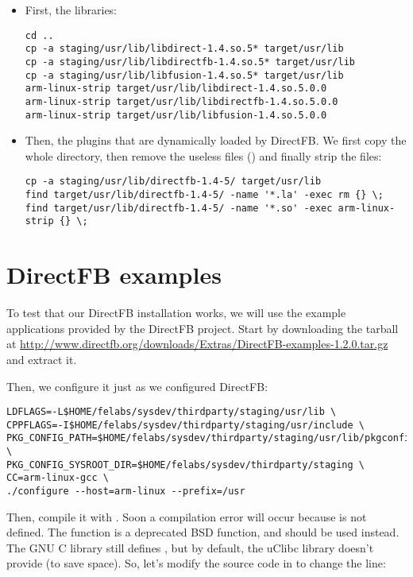 \begin{itemize}

\item First, the libraries:
\small
\begin{verbatim}
cd ..
cp -a staging/usr/lib/libdirect-1.4.so.5* target/usr/lib
cp -a staging/usr/lib/libdirectfb-1.4.so.5* target/usr/lib
cp -a staging/usr/lib/libfusion-1.4.so.5* target/usr/lib
arm-linux-strip target/usr/lib/libdirect-1.4.so.5.0.0
arm-linux-strip target/usr/lib/libdirectfb-1.4.so.5.0.0
arm-linux-strip target/usr/lib/libfusion-1.4.so.5.0.0
\end{verbatim}
\normalsize

\item Then, the plugins that are dynamically loaded by DirectFB. We
  first copy the whole  directory, then
  remove the useless files () and finally strip the
   files:

\small
\begin{verbatim}
cp -a staging/usr/lib/directfb-1.4-5/ target/usr/lib
find target/usr/lib/directfb-1.4-5/ -name '*.la' -exec rm {} \;
find target/usr/lib/directfb-1.4-5/ -name '*.so' -exec arm-linux-strip {} \;
\end{verbatim}
\normalsize

\end{itemize}

\section{DirectFB examples}

To test that our DirectFB installation works, we will use the example
applications provided by the DirectFB project. Start by downloading
the tarball at
\url{http://www.directfb.org/downloads/Extras/DirectFB-examples-1.2.0.tar.gz}
and extract it.

Then, we configure it just as we configured DirectFB:

\small
\begin{verbatim}
LDFLAGS=-L$HOME/felabs/sysdev/thirdparty/staging/usr/lib \
CPPFLAGS=-I$HOME/felabs/sysdev/thirdparty/staging/usr/include \
PKG_CONFIG_PATH=$HOME/felabs/sysdev/thirdparty/staging/usr/lib/pkgconfig \
PKG_CONFIG_SYSROOT_DIR=$HOME/felabs/sysdev/thirdparty/staging \
CC=arm-linux-gcc \
./configure --host=arm-linux --prefix=/usr
\end{verbatim}
\normalsize

Then, compile it with . Soon a compilation error will occur
because  is not defined. The \code{bzero} function is a deprecated
BSD function, and  should be used instead. The GNU C library
still defines , but by default, the uClibc library doesn't
provide  (to save space). So, let's modify the source code in
\code{src/df_knuckles/matrix.c} to change the line:

